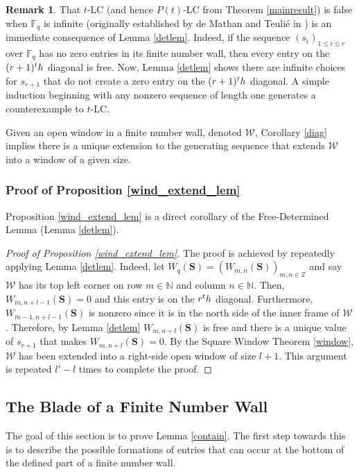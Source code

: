 \documentclass{article}
\theoremstyle{definition}
\newtheorem{remark}[theorem]{Remark}
\newcommand{\nth}{\textup{th}}
\newcommand{\N}{\mathbb{N}}
\newcommand{\F}{\mathbb{F}}
\newcommand{\Z}{\mathbb{Z}}
\numberwithin{equation}{subsection}
\begin{document}
\begin{remark}
    That $t$-LC (and hence $P(t)$-LC from Theorem \ref{mainresult}) is false when $\F_q$ is infinite (originally established by de Mathan and Teulié in \cite{padic}) is an immediate consequence of Lemma \ref{detlem}. Indeed, if the sequence $(s_i)_{1\le i \le r}$ over $\F_q$ has no zero entries in its finite number wall, then every entry on the $(r+1)^\nth$ diagonal is free. Now, Lemma \ref{detlem} shows there are infinite choices for $s_{r+1}$ that do not create a zero entry on the $(r+1)^\nth$ diagonal. A simple induction beginning with any nonzero sequence of length one generates a counterexample to $t$-LC. 
\end{remark}
\noindent Given an open window in a finite number wall, denoted $\mathcal{W}$, Corollary \ref{diag} implies there is a unique extension to the generating sequence that extends $\mathcal{W}$ into a window of a given size.
\subsubsection*{Proof of Proposition \ref{wind_extend_lem}}
\noindent Proposition \ref{wind_extend_lem} is a direct corollary of the Free-Determined Lemma (Lemma \ref{detlem}).
\begin{proof}[Proof of Proposition \ref{wind_extend_lem}]
    The proof is achieved by repeatedly applying Lemma \ref{detlem}. Indeed, let $W_q(\mathbf{S})=(W_{m,n}(\mathbf{S}))_{m,n\in\Z}$ and say $\mathcal{W}$ has its top left corner on row $m\in\N$ and column $n\in\N$. Then, $W_{m,n+l-1}(\mathbf{S})=0$ and this entry is on the $r^\nth$ diagonal. Furthermore, $W_{m-1,n+l-1}(\mathbf{S})$ is nonzero since it is in the north side of the inner frame of $\mathcal{W}$. Therefore, by Lemma \ref{detlem} $W_{m,n+l}(\mathbf{S})$ is free and there is a unique value of $s_{r+1}$ that makes $W_{m,n+l}(\mathbf{S})=0$. By the Square Window Theorem \ref{window}, $\mathcal{W}$ has been extended into a right-side open window of size $l+1$. This argument is repeated $l'-l$ times to complete the proof. 
\end{proof}

\subsection{The Blade of a Finite Number Wall}\label{Sect:Blade}

\noindent The goal of this section is to prove Lemma \ref{contain}. The first step towards this is to describe the possible formations of entries that can occur at the bottom of the defined part of a finite number wall. 
\end{document}

